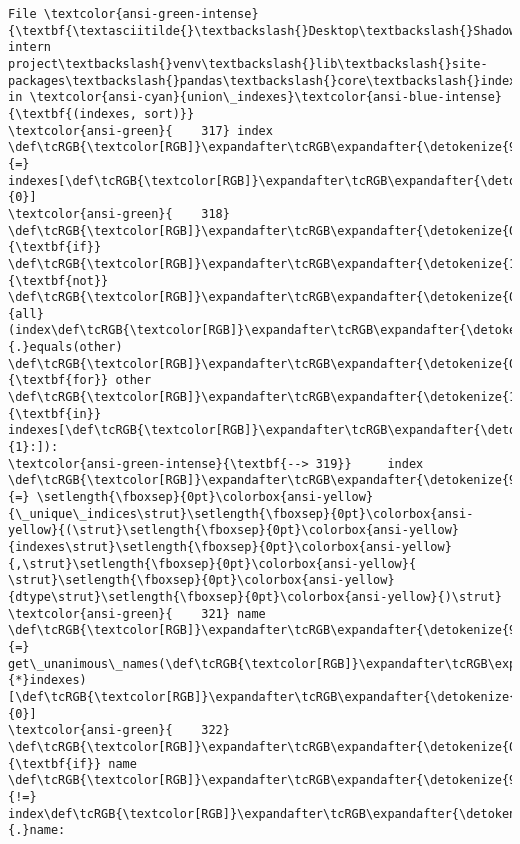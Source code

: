 \documentclass[11pt]{article}
\begin{document}
\begin{Verbatim}[commandchars=\\\{\}, frame=single, framerule=2mm, rulecolor=\color{outerrorbackground}]
File \textcolor{ansi-green-intense}{\textbf{\textasciitilde{}\textbackslash{}Desktop\textbackslash{}Shadowfox intern project\textbackslash{}venv\textbackslash{}lib\textbackslash{}site-packages\textbackslash{}pandas\textbackslash{}core\textbackslash{}indexes\textbackslash{}api.py:319}}, in \textcolor{ansi-cyan}{union\_indexes}\textcolor{ansi-blue-intense}{\textbf{(indexes, sort)}}
\textcolor{ansi-green}{    317} index \def\tcRGB{\textcolor[RGB]}\expandafter\tcRGB\expandafter{\detokenize{98,98,98}}{=} indexes[\def\tcRGB{\textcolor[RGB]}\expandafter\tcRGB\expandafter{\detokenize{98,98,98}}{0}]
\textcolor{ansi-green}{    318} \def\tcRGB{\textcolor[RGB]}\expandafter\tcRGB\expandafter{\detokenize{0,135,0}}{\textbf{if}} \def\tcRGB{\textcolor[RGB]}\expandafter\tcRGB\expandafter{\detokenize{175,0,255}}{\textbf{not}} \def\tcRGB{\textcolor[RGB]}\expandafter\tcRGB\expandafter{\detokenize{0,135,0}}{all}(index\def\tcRGB{\textcolor[RGB]}\expandafter\tcRGB\expandafter{\detokenize{98,98,98}}{.}equals(other) \def\tcRGB{\textcolor[RGB]}\expandafter\tcRGB\expandafter{\detokenize{0,135,0}}{\textbf{for}} other \def\tcRGB{\textcolor[RGB]}\expandafter\tcRGB\expandafter{\detokenize{175,0,255}}{\textbf{in}} indexes[\def\tcRGB{\textcolor[RGB]}\expandafter\tcRGB\expandafter{\detokenize{98,98,98}}{1}:]):
\textcolor{ansi-green-intense}{\textbf{--> 319}}     index \def\tcRGB{\textcolor[RGB]}\expandafter\tcRGB\expandafter{\detokenize{98,98,98}}{=} \setlength{\fboxsep}{0pt}\colorbox{ansi-yellow}{\_unique\_indices\strut}\setlength{\fboxsep}{0pt}\colorbox{ansi-yellow}{(\strut}\setlength{\fboxsep}{0pt}\colorbox{ansi-yellow}{indexes\strut}\setlength{\fboxsep}{0pt}\colorbox{ansi-yellow}{,\strut}\setlength{\fboxsep}{0pt}\colorbox{ansi-yellow}{ \strut}\setlength{\fboxsep}{0pt}\colorbox{ansi-yellow}{dtype\strut}\setlength{\fboxsep}{0pt}\colorbox{ansi-yellow}{)\strut}
\textcolor{ansi-green}{    321} name \def\tcRGB{\textcolor[RGB]}\expandafter\tcRGB\expandafter{\detokenize{98,98,98}}{=} get\_unanimous\_names(\def\tcRGB{\textcolor[RGB]}\expandafter\tcRGB\expandafter{\detokenize{98,98,98}}{*}indexes)[\def\tcRGB{\textcolor[RGB]}\expandafter\tcRGB\expandafter{\detokenize{98,98,98}}{0}]
\textcolor{ansi-green}{    322} \def\tcRGB{\textcolor[RGB]}\expandafter\tcRGB\expandafter{\detokenize{0,135,0}}{\textbf{if}} name \def\tcRGB{\textcolor[RGB]}\expandafter\tcRGB\expandafter{\detokenize{98,98,98}}{!=} index\def\tcRGB{\textcolor[RGB]}\expandafter\tcRGB\expandafter{\detokenize{98,98,98}}{.}name:


\end{Verbatim}
\end{document}
